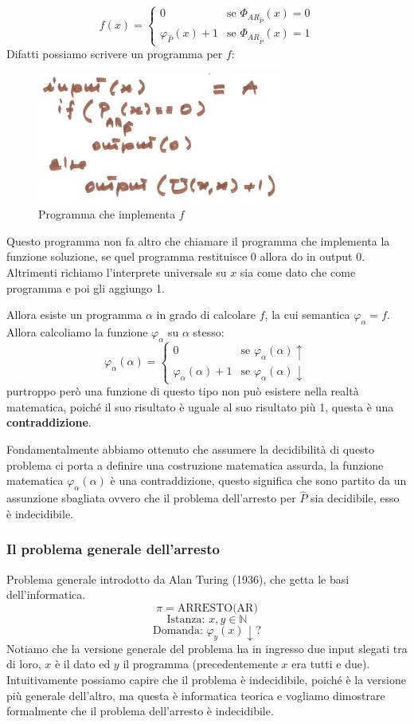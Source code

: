 \documentclass{article}
\begin{document}
\[
    f(x)=
    \begin{cases}
        0                      & \text{se }\Phi_{AR_{\hat{P}}}(x)=0  \\
        \varphi_{\hat{P}}(x)+1 & \text{se } \Phi_{AR_{\hat{P}}}(x)=1
    \end{cases}
\]
Difatti possiamo scrivere un programma per $f$:
\begin{figure}[H]
    \centering
    \includegraphics[scale=0.65]{images/prog_f.png}
    \caption{Programma che implementa $f$}
\end{figure}
Questo programma non fa altro che chiamare il programma che implementa
la funzione soluzione, se quel programma restituisce 0 allora do in output 0.
Altrimenti richiamo l'interprete universale su $x$ sia come dato che come programma
e poi gli aggiungo 1.

Allora esiste un programma $\alpha$ in grado di calcolare $f$, la cui semantica
$\varphi_\alpha=f$. Allora calcoliamo la funzione $\varphi_\alpha$ su $\alpha$
stesso:
\[
    \varphi_\alpha(\alpha)=
    \begin{cases}
        0                        & \text{se }\varphi_\alpha(\alpha)\uparrow   \\
        \varphi_\alpha(\alpha)+1 & \text{se }\varphi_\alpha(\alpha)\downarrow
    \end{cases}
\]
purtroppo però una funzione di questo tipo non può esistere nella realtà matematica,
poiché il suo risultato è uguale al suo risultato più 1, questa è una \textbf{contraddizione}.

Fondamentalmente abbiamo ottenuto che assumere la decidibilità di questo problema ci porta
a definire una costruzione matematica assurda, la funzione matematica $\varphi_\alpha(\alpha)$
è una contraddizione, questo significa che sono partito da un assunzione sbagliata ovvero
che il problema dell'arresto per $\hat{P}$ sia decidibile, esso è indecidibile.

\subsubsection{Il problema generale dell'arresto}
Problema generale introdotto da Alan Turing (1936), che getta le basi dell'informatica.
$$\pi=\text{ARRESTO(AR)}$$
$$\text{Istanza: }x,y\in\mathbb{N}$$
$$\text{Domanda: }\varphi_y(x)\downarrow?$$
Notiamo che la versione generale del problema ha in ingresso due input slegati tra di loro,
$x$ è il dato ed $y$ il programma (precedentemente $x$ era tutti e due). Intuitivamente
possiamo capire che il problema è indecidibile, poiché è la versione più generale dell'altro,
ma questa è informatica teorica e vogliamo dimostrare formalmente che il problema dell'arresto
è indecidibile.
\end{document}
